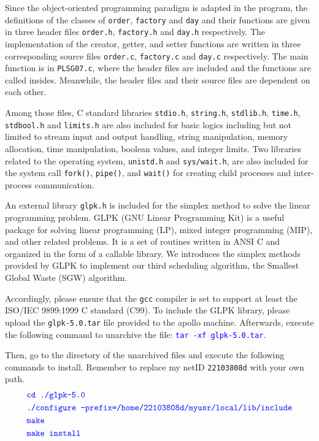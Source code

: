\documentclass[a4paper, 12pt]{article}
\begin{document}
Since the object-oriented programming paradigm is adapted in the program, the definitions of the classes of \texttt{order}, \texttt{factory} and \texttt{day} and their functions are given in three header files \texttt{order.h}, \texttt{factory.h} and \texttt{day.h} respectively. 
The implementation of the creator, getter,  and setter functions are written in three corresponding source files \texttt{order.c}, \texttt{factory.c} and \texttt{day.c} respectively. The main function is in \texttt{PLS\textunderscore G07.c}, where the header files are included and the functions are called insides.
Meanwhile, the header files and their source files are dependent on each other. 

Among those files, C standard libraries \texttt{stdio.h}, \texttt{string.h}, \texttt{stdlib.h}, \texttt{time.h}, \texttt{stdbool.h} and \texttt{limits.h} are also included for basic logics including but not limited to stream input and output handling, string manipulation, memory allocation, time manipulation, boolean values, and integer limits.
Two libraries related to the operating system, \texttt{unistd.h} and \texttt{sys/wait.h}, are also included for the system call \texttt{fork()}, \texttt{pipe()}, and \texttt{wait()} for creating child processes and inter-process communication.

An external library \texttt{glpk.h} is included for the simplex method to solve the linear programming problem. GLPK (GNU Linear Programming Kit) is a useful package for solving linear programming (LP), mixed integer programming (MIP), and other related problems. 
It is a set of routines written in ANSI C and organized in the form of a callable library. We introduces the simplex methods provided by GLPK to implement our third scheduling algorithm, the Smallest Global Waste (SGW) algorithm.

Accordingly, please ensure that the \texttt{gcc} compiler is set to support at least the ISO/IEC 9899:1999 C standard (C99). 
To include the GLPK library, please upload the \texttt{glpk-5.0.tar} file provided to the apollo machine. Afterwards, execute the following command to unarchive the file:
\textcolor{blue}{\texttt{tar -xf glpk-5.0.tar}}.


Then, go to the directory of the unarchived files and execute the following commands to install. Remember to 
replace my netID \texttt{22103808d} with your own path.
\begin{alignat}{1}
    &\textcolor{blue}{\texttt{cd ./glpk-5.0}} \nonumber \\
    &\textcolor{blue}{\texttt{./configure --prefix=/home/22103808d/myusr/local/lib/include}} \nonumber \\
    &\textcolor{blue}{\texttt{make}} \nonumber \\
    &\textcolor{blue}{\texttt{make install}} \nonumber
\end{alignat}
\end{document}
